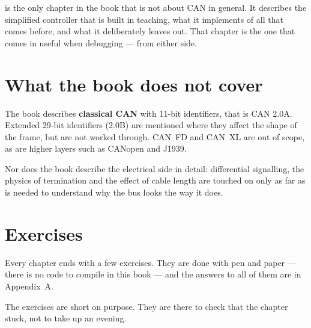  is the only chapter in the book that is not about CAN in general. It describes
the simplified controller that is built in teaching, what it implements of all that comes before,
and what it deliberately leaves out. That chapter is the one that comes in useful when debugging
--- from either side.

\section*{What the book does not cover}

The book describes \textbf{classical CAN} with 11-bit identifiers, that is CAN 2.0A. Extended
29-bit identifiers (2.0B) are mentioned where they affect the shape of the frame, but are not
worked through. CAN~FD and CAN~XL are out of scope, as are higher layers such as CANopen and
J1939.

Nor does the book describe the electrical side in detail: differential signalling, the physics of
termination and the effect of cable length are touched on only as far as is needed to understand
why the bus looks the way it does.

\section*{Exercises}

Every chapter ends with a few exercises. They are done with pen and paper --- there is no code to
compile in this book --- and the answers to all of them are in Appendix~A.

The exercises are short on purpose. They are there to check that the chapter stuck, not to take up
an evening.
